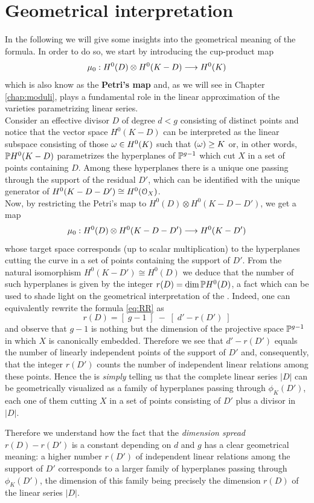 \section{Geometrical interpretation}

	In the following we will give some insights into the geometrical meaning of the \RR formula. In order to do so, we start by introducing the cup-product map
	$$ \mu_0: H^0(D)\otimes H^0(K-D) \longrightarrow H^0(K) $$ 
	which is also know as the \textbf{Petri's map} and, as we will see in Chapter \ref{chap:moduli}, plays a fundamental role in the linear approximation of the varieties \moduu parametrizing linear series.\\

	Consider an effective divisor $D$ of degree $d<g$ consisting of distinct points and notice that the vector space $H^0(K-D)$ can be interpreted as the linear subspace consisting of those $\omega\in H^0(K)$ such that $(\omega)\geq K$ or, in other words, $\mathbb{P} H^0(K-D)$ parametrizes the hyperplanes of $\mathbb{P}^{g-1}$ which cut $X$ in a set of points containing $D$. Among these hyperplanes there is a unique one passing through the support of the residual $D'$, which can be identified with the unique generator of $H^0(K-D-D')\cong H^0(\mathcal{O}_X)$.\\ 
	Now, by restricting the Petri's map to $H^0(D)\otimes H^0(K-D-D')$, we get a map
	$$ \mu_0: H^0(D)\otimes H^0(K-D-D') \longrightarrow H^0(K-D') $$
	whose target space corresponds (up to scalar multiplication) to the hyperplanes cutting the curve in a set of points containing the support of $D'$. From the natural isomorphism $H^0(K-D')\cong H^0(D)$ we deduce that the number of such hyperplanes is given by the integer $r(D) = \dim \mathbb{P} H^0(D)$, a fact which can be used to shade light on the geometrical interpretation of the \RR. Indeed, one can equivalently rewrite the formula \eqref{eq:RR} as
	$$ r(D) = [\;g-1\;] \; - \; [\;d'-r(D')\;] $$
	and observe that $g-1$ is nothing but the dimension of the projective space $\mathbb{P}^{g-1}$ in which $X$ is canonically embedded. Therefore we see that $d'-r(D')$ equals the number of linearly independent points of the support of $D'$ and, consequently, that the integer $r(D')$ counts the number of independent linear relations among these points. Hence the \RR is \emph{simply} telling us that the complete linear series $|D|$ can be geometrically visualized as a family of hyperplanes passing through $\phi_K(D')$, each one of them cutting $X$ in a set of points consisting of $D'$ plus a divisor in $|D|$.

	Therefore we understand how the fact that the \emph{dimension spread} $r(D)-r(D')$ is a constant depending on $d$ and $g$ has a clear geometrical meaning: a higher number $r(D')$ of independent linear relations among the support of $D'$ corresponds to a larger family of hyperplanes passing through $\phi_K(D')$, the dimension of this family being precisely the dimension $r(D)$ of the linear series $|D|$.\\  

